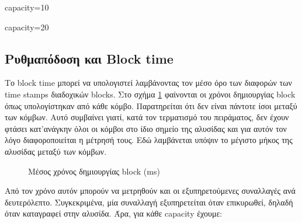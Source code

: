 \documentclass{article}
\newcommand{\eng}[1]{\foreignlanguage{english}{#1}} %
\begin{document}
\begin{table}[ht]
    \ContinuedFloat
    \begin{subtable}{0.45\textwidth}
        \centering
        \caption{\eng{capacity=10}}
        \label{tab:throughput-funcs-2}
    \end{subtable}
    \hfill
    \begin{subtable}{0.45\textwidth}
        \centering
        \caption{\eng{capacity=20}}
        \label{tab:throughput-funcs-3}
    \end{subtable}
\end{table}
\FloatBarrier

\subsection{Ρυθμαπόδοση και \eng{Block time}}

Το \eng{block time} μπορεί να υπολογιστεί λαμβάνοντας τον μέσο όρο των
διαφορών των \eng{time stamps} διαδοχικών \eng{blocks}. Στο σχήμα
\ref{fig:throughput-blocktimes} φαίνονται οι χρόνοι δημιουργίας \eng{block} όπως
υπολογίστηκαν από κάθε κόμβο. Παρατηρείται ότι δεν είναι πάντοτε ίσοι μεταξύ
των κόμβων. Αυτό συμβαίνει γιατί, κατά τον τερματισμό του πειράματος, δεν έχουν
φτάσει κατ'ανάγκην όλοι οι κόμβοι στο ίδιο σημείο της αλυσίδας και για αυτόν τον
λόγο διαφοροποιείται η μέτρησή τους. Εδώ λαμβάνεται υπόψιν το μέγιστο μήκος της
αλυσίδας μεταξύ των κόμβων.

\begin{figure}[ht]
    \centering
    \begin{varwidth}{\linewidth}
        
    \end{varwidth}
    \caption{Μέσος χρόνος δημιουργίας \eng{block} (\eng{ms})}
    \label{fig:throughput-blocktimes}
\end{figure}

Από τον χρόνο αυτόν μπορούν να μετρηθούν και οι εξυπηρετούμενες συναλλαγές ανά δευτερόλεπτο.
Συγκεκριμένα, μία συναλλαγή εξυπηρετείται όταν επικυρωθεί, δηλαδή όταν καταγραφεί στην αλυσίδα.
Άρα, για κάθε \eng{capacity} έχουμε:
\end{document}
